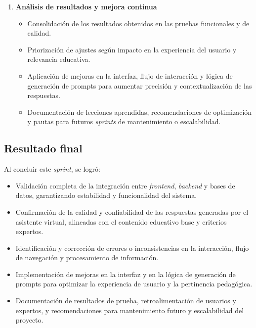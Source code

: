 \begin{enumerate}
      \item \textbf{Análisis de resultados y mejora continua}
            \begin{itemize}
                  \item Consolidación de los resultados obtenidos en las pruebas funcionales y de
                        calidad.
                  \item Priorización de ajustes según impacto en la experiencia del usuario y
                        relevancia educativa.
                  \item Aplicación de mejoras en la interfaz, flujo de interacción y lógica de
                        generación de prompts para aumentar precisión y contextualización de las
                        respuestas.
                  \item Documentación de lecciones aprendidas, recomendaciones de optimización y pautas
                        para futuros \textit{sprints} de mantenimiento o escalabilidad.
            \end{itemize}
\end{enumerate}

\subsection{Resultado final}
Al concluir este \textit{sprint}, se logró:

\begin{itemize}
      \item Validación completa de la integración entre \textit{frontend}, \textit{backend}
            y bases de datos, garantizando estabilidad y funcionalidad del sistema.
      \item Confirmación de la calidad y confiabilidad de las respuestas generadas por el
            asistente virtual, alineadas con el contenido educativo base y criterios
            expertos.
      \item Identificación y corrección de errores o inconsistencias en la interacción,
            flujo de navegación y procesamiento de información.
      \item Implementación de mejoras en la interfaz y en la lógica de generación de
            prompts para optimizar la experiencia de usuario y la pertinencia pedagógica.
      \item Documentación de resultados de prueba, retroalimentación de usuarios y
            expertos, y recomendaciones para mantenimiento futuro y escalabilidad del
            proyecto.
\end{itemize}

